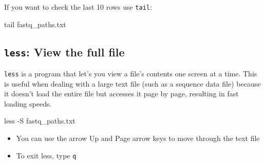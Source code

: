 \documentclass[
  letterpaper,
  DIV=11,
  numbers=noendperiod]{scrreprt}
\newenvironment{Shaded}{}{}
\newcommand{\AttributeTok}[1]{\textcolor[rgb]{0.84,0.23,0.29}{#1}}
\newcommand{\FunctionTok}[1]{\textcolor[rgb]{0.44,0.26,0.76}{#1}}
\newcommand{\NormalTok}[1]{\textcolor[rgb]{0.14,0.16,0.18}{#1}}
\providecommand{\tightlist}{%
  \setlength{\itemsep}{0pt}\setlength{\parskip}{0pt}}\usepackage{longtable,booktabs,array}
\begin{document}
If you want to check the last 10 rows use \texttt{tail}:

\begin{Shaded}
\begin{Highlighting}[]
\FunctionTok{tail}\NormalTok{ fastq\_paths.txt}
\end{Highlighting}
\end{Shaded}

\subsection{\texorpdfstring{\texttt{less}: View the full
file}{less: View the full file}}\label{less-view-the-full-file}

\texttt{less} is a program that let's you view a file's contents one
screen at a time. This is useful when dealing with a large text file
(such as a sequence data file) because it doesn't load the entire file
but accesses it page by page, resulting in fast loading speeds.

\begin{Shaded}
\begin{Highlighting}[]
\FunctionTok{less} \AttributeTok{{-}S}\NormalTok{ fastq\_paths.txt}
\end{Highlighting}
\end{Shaded}

\begin{itemize}
\tightlist
\item
  You can use the arrow Up and Page arrow keys to move through the text
  file
\item
  To exit less, type \texttt{q}
\end{itemize}
\end{document}
